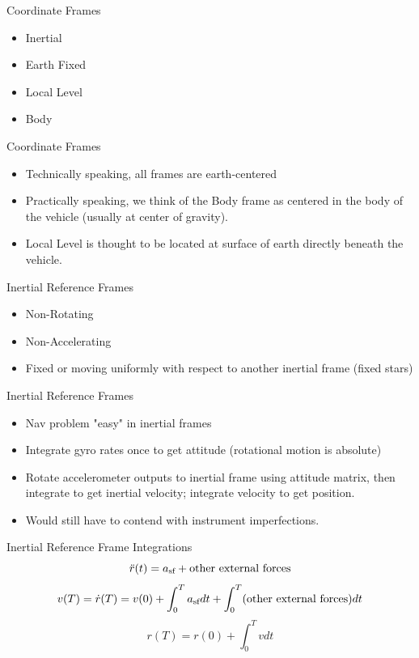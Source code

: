 \begin{frame}
Coordinate Frames
 \begin{itemize}
 \item Inertial
 \item Earth Fixed
 \item Local Level
 \item Body
\end{itemize}
\end{frame}
\begin{frame}
Coordinate Frames
 \begin{itemize}
  \item Technically speaking, all frames are earth-centered
  \item Practically speaking, we think of the Body frame as centered in the body of the vehicle (usually at center of gravity).
  \item Local Level is thought to be located at surface of earth directly beneath the vehicle.
\end{itemize}
\end{frame}
\begin{frame}
Inertial Reference Frames
 \begin{itemize}
 \item Non-Rotating
 \item Non-Accelerating
 \item Fixed or moving uniformly with respect to another inertial
 frame (fixed stars)
\end{itemize}
\end{frame}
\begin{frame}
Inertial Reference Frames
 \begin{itemize}
 \item Nav problem "easy" in inertial frames
 \item Integrate gyro rates once to get attitude (rotational motion is absolute)
 \item Rotate accelerometer outputs to inertial frame using attitude matrix, then integrate to get inertial
 velocity; integrate velocity to get position.
 \item Would still have to contend with instrument imperfections.
\end{itemize}
\end{frame}
\begin{frame}
Inertial Reference Frame Integrations
\begin{equation}\label{inertacceleq}
\ddot{r}(t)=a_{\text{sf}}+\text{other external forces}
\end{equation}
\begin{equation}\label{inertveleq}
v(T)=\dot{r}(T)=v(0)+\int_{0}^{T}a_{\text{sf}} dt + \int_{0}^{T}(\text{other
external forces})dt
\end{equation}
\begin{equation}\label{inertposeq}
  r(T)=r(0)+\int_{0}^{T}v dt
\end{equation}
\end{frame}
